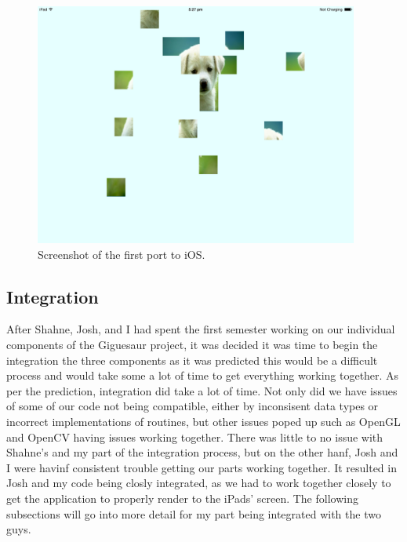 \documentclass{article}
\begin{document}
\begin{figure}[ht]
\begin{center}
\includegraphics[width=0.95\textwidth]{images/iPadPortImage}
\caption{Screenshot of the first port to iOS.}
\label{fig:iPadPort}
\end{center}
\end{figure}

\subsection{Integration}
After Shahne, Josh, and I had spent the first semester working on our individual
components of the Giguesaur project, it was decided it was time to begin the
integration the three components as it was predicted this would be a difficult
process and would take some a lot of time to get everything working together. As
per the prediction, integration did take a lot of time. Not only did we have
issues of some of our code not being compatible, either by inconsisent data
types or incorrect implementations of routines, but other issues poped up such
as OpenGL and OpenCV having issues working together. There was little to no
issue with Shahne's and my part of the integration process, but on the other
hanf, Josh and I were havinf consistent trouble getting our parts working
together. It resulted in Josh and my code being closly integrated, as we had to
work together closely to get the application to properly render to the iPads'
screen. The following subsections will go into more detail for my part being
integrated with the two guys.
\end{document}
